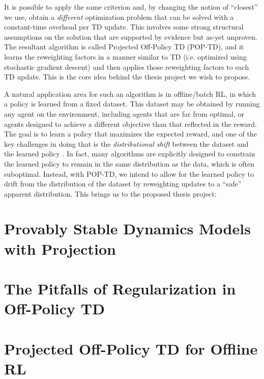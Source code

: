 \documentclass[11pt]{book}
\begin{document}
It is possible to apply the same criterion and, by changing the notion of ``closest'' we use, obtain a \emph{different} optimization problem that can be solved with a constant-time overhead per TD update. This involves some strong structural assumptions on the solution that are supported by evidence but as-yet unproven. The resultant algorithm is called Projected Off-Policy TD (POP-TD), and it learns the reweighting factors in a manner similar to TD (i.e. optimized using stochastic gradient descent) and then applies those reweighting factors to each TD update. This is the core idea behind the thesis project we wish to propose.

A natural application area for such an algorithm is in offline/batch RL, in which a policy is learned from a fixed dataset. This dataset may be obtained by running any agent on the environment, including agents that are far from optimal, or agents designed to achieve a different objective than that reflected in the reward. The goal is to learn a policy that maximizes the expected reward, and one of the key challenges in doing that is the \emph{distributional shift} between the dataset and the learned policy \cite{levine2020survey}. In fact, many algorithms are explicitly designed to constrain the learned policy to remain in the same distribution as the data, which is often suboptimal. Instead, with POP-TD, we intend to allow for the learned policy to drift from the distribution of the dataset by reweighting updates to a ``safe'' apparent distribution. This brings us to the proposed thesis project:


\mainmatter
\chapter{Provably Stable Dynamics Models with Projection}




\chapter{The Pitfalls of Regularization in Off-Policy TD}



\chapter{Projected Off-Policy TD for Offline RL}
\end{document}
